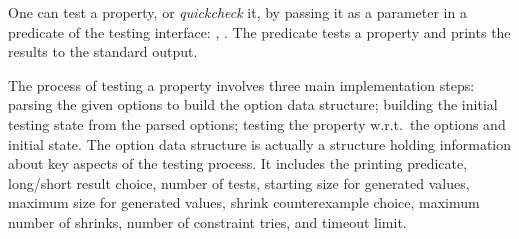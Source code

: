 One can test a property, or \emph{quickcheck} it,  by passing it as a parameter in a
predicate of the \plqc{} testing interface: ,
 .
%
The  predicate tests a property and prints the results
to the standard output.
%
%
%
%
%
%


The process of testing a property 
involves three main implementation steps: parsing the given options to build the option data
structure; building the initial testing state from the parsed options; testing the
property w.r.t.\ the  options and initial state.
%
The option data structure is actually a structure holding information
about key aspects of the testing process.
%
It includes the printing predicate, long/short result choice, number of
tests, starting size for generated values, maximum size for generated
values, shrink counterexample choice, maximum number of shrinks, number
of constraint tries, and timeout limit.

